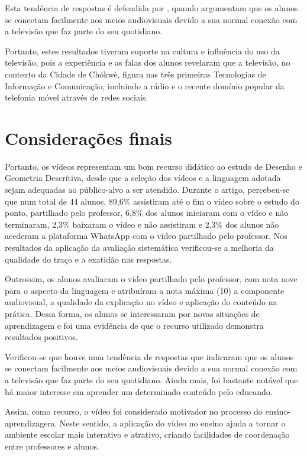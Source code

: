 \documentclass[portuguese]{textolivre}
\begin{document}
Esta tendência de respostas é defendida por \textcite{silveira2020}, quando argumentam que os alunos se conectam facilmente aos meios audiovisuais devido a sua normal conexão com a televisão que faz parte do seu quotidiano.

Portanto, estes resultados tiveram suporte na cultura e influência do uso da televisão, pois a experiência e as falas dos alunos revelaram que a televisão, no contexto da Cidade de Chókwè, figura nas três primeiras Tecnologias de Informação e Comunicação, incluindo a rádio e o recente domínio popular da telefonia móvel através de redes sociais.

\section{Considerações finais}\label{sec-cinco}
Portanto, os vídeos representam um bom recurso didático ao estudo de Desenho e Geometria Descritiva, desde que a seleção dos vídeos e a linguagem adotada sejam adequadas ao público-alvo a ser atendido. Durante o artigo, percebeu-se que num total de 44 alunos, 89,6\% assistiram até o fim o vídeo sobre o estudo do ponto, partilhado pelo professor, 6,8\% dos alunos iniciaram com o vídeo e não terminaram, 2,3\% baixaram o vídeo e não assistiram e 2,3\% dos alunos não acederam a plataforma WhatsApp com o vídeo partilhado pelo professor. Nos resultados da aplicação da avaliação sistemática verificou-se a melhoria da qualidade do traço e a exatidão nas respostas.

Outrossim, os alunos avaliaram o vídeo partilhado pelo professor, com nota nove para o aspecto da linguagem e atribuíram a nota máxima (10) a componente audiovisual, a qualidade da explicação no vídeo e aplicação do conteúdo na prática. Dessa forma, os alunos se interessaram por novas situações de aprendizagem e foi uma evidência de que o recurso utilizado demonstra resultados positivos.

Verificou-se que houve uma tendência de respostas que indicaram que os alunos se conectam facilmente aos meios audiovisuais devido a sua normal conexão com a televisão que faz parte do seu quotidiano. Ainda mais, foi bastante notável que há maior interesse em aprender um determinado conteúdo pelo educando.

Assim, como recurso, o vídeo foi considerado motivador no processo do ensino-aprendizagem. Neste sentido, a aplicação do vídeo no ensino ajuda a tornar o ambiente escolar mais interativo e atrativo, criando facilidades de coordenação entre professores e alunos.
\end{document}
